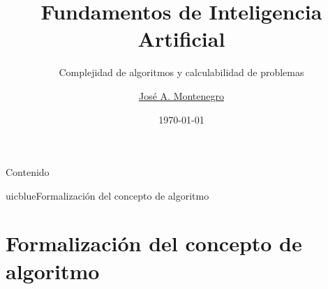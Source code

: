 \documentclass[xcolor=table]{beamer}
\title{Fundamentos de Inteligencia Artificial}
\subtitle{Complejidad de algoritmos y calculabilidad de problemas}
\author{\href{mailto:jmmontes@uma.es}{José A. Montenegro}}
\date{\today}
\begin{document}
\newtheorem{mydef}{Definición}[section] %
\maketitle






\begin{frame}{Contenido}
\tableofcontents
\end{frame}



\begin{chapter}{uicblue}{Formalización del concepto de algoritmo}
\end{chapter}

\section{Formalización del concepto de algoritmo}
\end{document}
